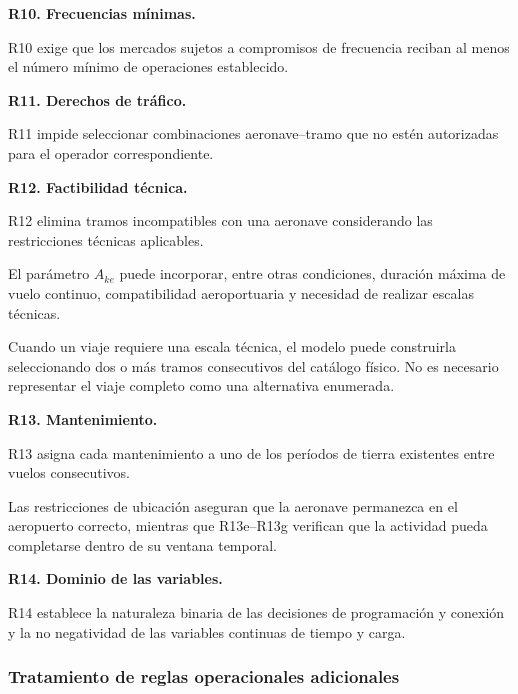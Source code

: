 \vspace{0.5em}
\noindent\textbf{R10. Frecuencias mínimas.}

R10 exige que los mercados sujetos a compromisos de frecuencia reciban al menos el número
mínimo de operaciones establecido.


\vspace{0.5em}
\noindent\textbf{R11. Derechos de tráfico.}

R11 impide seleccionar combinaciones aeronave--tramo que no estén autorizadas para el operador
correspondiente.


\vspace{0.5em}
\noindent\textbf{R12. Factibilidad técnica.}

R12 elimina tramos incompatibles con una aeronave considerando las restricciones técnicas
aplicables.

El parámetro $A_{ke}$ puede incorporar, entre otras condiciones, duración máxima de vuelo
continuo, compatibilidad aeroportuaria y necesidad de realizar escalas técnicas.

Cuando un viaje requiere una escala técnica, el modelo puede construirla seleccionando dos o
más tramos consecutivos del catálogo físico. No es necesario representar el viaje completo
como una alternativa enumerada.


\vspace{0.5em}
\noindent\textbf{R13. Mantenimiento.}

R13 asigna cada mantenimiento a uno de los períodos de tierra existentes entre vuelos
consecutivos.

Las restricciones de ubicación aseguran que la aeronave permanezca en el aeropuerto correcto,
mientras que R13e--R13g verifican que la actividad pueda completarse dentro de su ventana
temporal.


\vspace{0.5em}
\noindent\textbf{R14. Dominio de las variables.}

R14 establece la naturaleza binaria de las decisiones de programación y conexión y la no
negatividad de las variables continuas de tiempo y carga.


\subsubsection{Tratamiento de reglas operacionales adicionales}
\label{app:reglas_adicionales}

